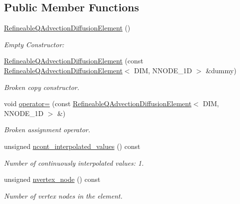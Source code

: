\subsection*{Public Member Functions}
\begin{DoxyCompactItemize}
\item 
\hyperlink{classoomph_1_1RefineableQAdvectionDiffusionElement_afe0bc3fd117961443225cf400a7c590b}{Refineable\+Q\+Advection\+Diffusion\+Element} ()
\begin{DoxyCompactList}\small\item\em Empty Constructor\+: \end{DoxyCompactList}\item 
\hyperlink{classoomph_1_1RefineableQAdvectionDiffusionElement_ae585e371320d8e39f322f5f8e944371f}{Refineable\+Q\+Advection\+Diffusion\+Element} (const \hyperlink{classoomph_1_1RefineableQAdvectionDiffusionElement}{Refineable\+Q\+Advection\+Diffusion\+Element}$<$ D\+IM, N\+N\+O\+D\+E\+\_\+1D $>$ \&dummy)
\begin{DoxyCompactList}\small\item\em Broken copy constructor. \end{DoxyCompactList}\item 
void \hyperlink{classoomph_1_1RefineableQAdvectionDiffusionElement_a8330801fec59403883217246cac3e55e}{operator=} (const \hyperlink{classoomph_1_1RefineableQAdvectionDiffusionElement}{Refineable\+Q\+Advection\+Diffusion\+Element}$<$ D\+IM, N\+N\+O\+D\+E\+\_\+1D $>$ \&)
\begin{DoxyCompactList}\small\item\em Broken assignment operator. \end{DoxyCompactList}\item 
unsigned \hyperlink{classoomph_1_1RefineableQAdvectionDiffusionElement_acc6081866ab4080702515823f1eea83c}{ncont\+\_\+interpolated\+\_\+values} () const
\begin{DoxyCompactList}\small\item\em Number of continuously interpolated values\+: 1. \end{DoxyCompactList}\item 
unsigned \hyperlink{classoomph_1_1RefineableQAdvectionDiffusionElement_a158f8e02a8fc6b9a1c650b3e0f832041}{nvertex\+\_\+node} () const
\begin{DoxyCompactList}\small\item\em Number of vertex nodes in the element. \end{DoxyCompactList}\item 

\end{DoxyCompactItemize}

